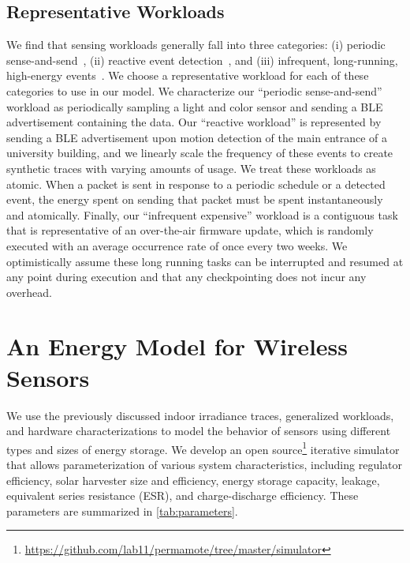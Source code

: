 \subsection{Representative Workloads}
We find that sensing workloads generally fall into three
categories: (i) periodic sense-and-send~\cite{mainwaring2002wireless}, (ii) reactive event detection~\cite{campbellEnergy14,afanasov2020battery}, and (iii) infrequent,
long-running, high-energy events~\cite{levis2004trickle}. We choose a representative workload for each
of these categories to use in our model.
We characterize our ``periodic sense-and-send''
workload as periodically sampling a light and color sensor and sending a
BLE
advertisement containing the data.
Our ``reactive workload'' is
represented by sending a BLE advertisement upon motion detection of the main
entrance of a university building, and we linearly scale the frequency
of these events to create synthetic traces with varying amounts of usage. 
We treat these workloads as atomic. 
When a packet is sent in response to a periodic schedule or a detected event, the energy spent on sending that packet must be spent instantaneously and atomically.  
Finally, our ``infrequent expensive'' workload is a
contiguous
task that is representative of an
over-the-air firmware update, which is randomly executed with an average occurrence rate
of once every two weeks.
We optimistically assume these long running tasks can be interrupted
and resumed at any point during execution and that any checkpointing does not incur any overhead.


\section{An Energy Model for Wireless Sensors}
We use the previously discussed indoor irradiance traces, generalized
workloads, and hardware characterizations to model the behavior of sensors
using different types and sizes of energy storage. We develop an open
source\footnote{\url{https://github.com/lab11/permamote/tree/master/simulator}}
iterative simulator that allows parameterization of various system
characteristics, including regulator efficiency, solar harvester size
and efficiency, energy storage capacity, leakage, equivalent series resistance (ESR), and charge-discharge
efficiency. These parameters are summarized in \cref{tab:parameters}.

